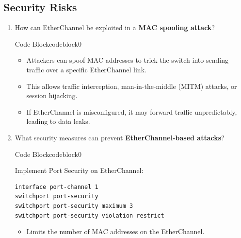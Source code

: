 \documentclass[a4paper]{article}
\begin{document}
\subsection{Security Risks}
\begin{enumerate}
	\item How can EtherChannel be exploited in a \textbf{MAC spoofing attack}?


	      \begin{ocg}{Code Block}{codeblock}{0}

		      \vspace{0.5cm}

		      \begin{tcolorbox}
			      \begin{itemize}
				      \item Attackers can spoof MAC addresses to trick the switch into sending traffic over a specific EtherChannel link.
				      \item This allows traffic interception, man-in-the-middle (MITM) attacks, or session hijacking.
				      \item If EtherChannel is misconfigured, it may forward traffic unpredictably, leading to data leaks.
			      \end{itemize}
		      \end{tcolorbox}

		      \vspace{0.5cm}
	      \end{ocg}
	\item What security measures can prevent \textbf{EtherChannel-based attacks}?



	      \begin{ocg}{Code Block}{codeblock}{0}

		      \vspace{0.5cm}

		      Implement Port Security on EtherChannel:

		      \begin{lstlisting}
interface port-channel 1
switchport port-security
switchport port-security maximum 3
switchport port-security violation restrict
            \end{lstlisting}
		      \begin{itemize}
			      \item \small Limits the number of MAC addresses on the EtherChannel.
		      \end{itemize}
		      \vspace{1cm}


\end{ocg}
\end{enumerate}
\end{document}
